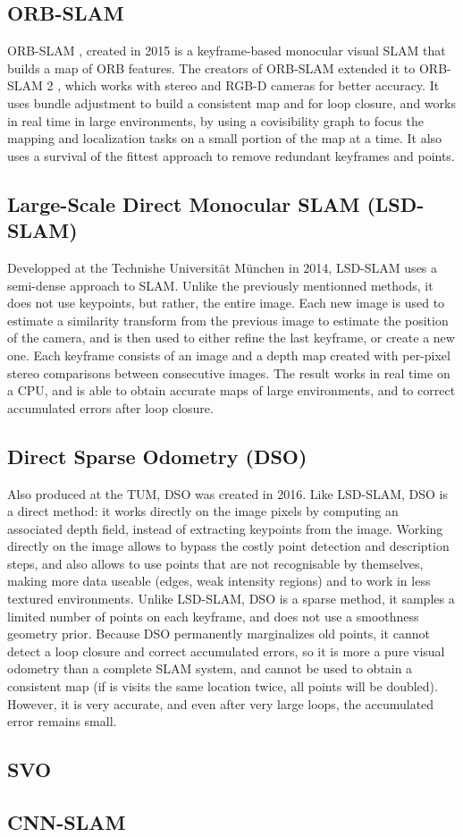 \subsection{ORB-SLAM}
ORB-SLAM \cite{orbslam}, created in 2015 is a keyframe-based monocular visual SLAM that builds a map of ORB features. The creators of ORB-SLAM extended it to ORB-SLAM 2 \cite{orbslam2}, which works with stereo and RGB-D cameras for better accuracy. It uses bundle adjustment to build a consistent map and for loop closure, and works in real time in large environments, by using a covisibility graph to focus the mapping and localization tasks on a small portion of the map at a time. It also uses a survival of the fittest approach to remove redundant keyframes and points.

\subsection{Large-Scale Direct Monocular SLAM (LSD-SLAM)}
Developped at the Technishe Universität München in 2014, LSD-SLAM \cite{lsdslam} uses a semi-dense approach to SLAM. Unlike the previously mentionned methods, it does not use keypoints, but rather, the entire image. Each new image is used to estimate a similarity transform from the previous image to estimate the position of the camera, and is then used to either refine the last keyframe, or create a new one. Each keyframe consists of an image and a depth map created with per-pixel stereo comparisons between consecutive images. The result works in real time on a CPU, and is able to obtain accurate maps of large environments, and to correct accumulated errors after loop closure.

\subsection{Direct Sparse Odometry (DSO)}
Also produced at the TUM, DSO \cite{dso} was created in 2016. Like LSD-SLAM, DSO is a direct method: it works directly on the image pixels by computing an associated depth field, instead of extracting keypoints from the image. Working directly on the image allows to bypass the costly point detection and description steps, and also allows to use points that are not recognisable by themselves, making more data useable (edges, weak intensity regions) and to work in less textured environments. Unlike LSD-SLAM, DSO is a sparse method, it samples a limited number of points on each keyframe, and does not use a smoothness geometry prior. Because DSO permanently marginalizes old points, it cannot detect a loop closure and correct accumulated errors, so it is more a pure visual odometry than a complete SLAM system, and cannot be used to obtain a consistent map (if is visits the same location twice, all points will be doubled). However, it is very accurate, and even after very large loops, the accumulated error remains small.

\subsection{SVO}

\subsection{CNN-SLAM}
